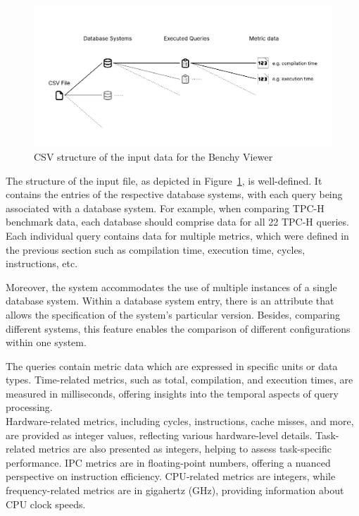 \begin{figure}[h]
  \centering
  \includegraphics[width=1\linewidth]{figures/csv-structure.pdf}
  \caption{CSV structure of the input data for the Benchy Viewer}
  \label{fig:csv-structure}
\end{figure}

The structure of the input file, as depicted in Figure~\ref{fig:csv-structure}, is well-defined. It contains the entries of the respective database systems, with each query being associated with a database system. For example, when comparing TPC-H benchmark data, each database should comprise data for all 22 TPC-H queries. Each individual query contains data for multiple metrics, which were defined in the previous section such as compilation time, execution time, cycles, instructions, etc.

Moreover, the system accommodates the use of multiple instances of a single database system. Within a database system entry, there is an attribute that allows the specification of the system's particular version. Besides, comparing different systems, this feature enables the comparison of different configurations within one system.

The queries contain metric data  which are expressed in specific units or data types. Time-related metrics, such as total, compilation, and execution times, are measured in milliseconds, offering insights into the temporal aspects of query processing.\\
Hardware-related metrics, including cycles, instructions, cache misses, and more, are provided as integer values, reflecting various hardware-level details. Task-related metrics are also presented as integers, helping to assess task-specific performance. IPC metrics are in floating-point numbers, offering a nuanced perspective on instruction efficiency. CPU-related metrics are integers, while frequency-related metrics are in gigahertz (GHz), providing information about CPU clock speeds.

